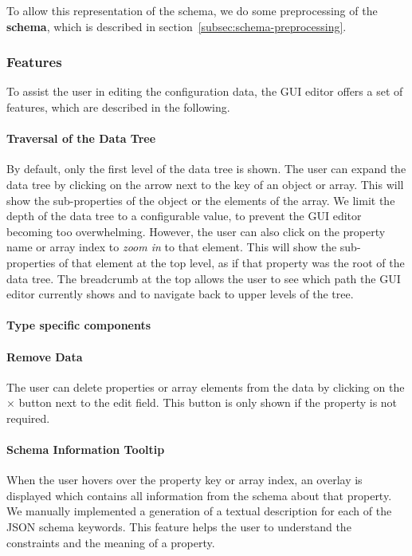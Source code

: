 To allow this representation of the schema, we do some preprocessing of the \textbf{schema}, which is described in section~\ref{subsec:schema-preprocessing}.

\subsubsection{Features}\label{subsubsec:gui-editor-features}

To assist the user in editing the configuration data, the GUI editor offers a set of features, which are described in the following.

\paragraph{Traversal of the Data Tree}
By default, only the first level of the data tree is shown.
The user can expand the data tree by clicking on the arrow next to the key of an object or array.
This will show the sub-properties of the object or the elements of the array.
We limit the depth of the data tree to a configurable value, to prevent the GUI editor becoming too overwhelming.
However, the user can also click on the property name or array index to \textit{zoom in} to that element.
This will show the sub-properties of that element at the top level, as if that property was the root of the data tree.
The breadcrumb at the top allows the user to see which path the GUI editor currently shows and to navigate back to upper levels of the tree.


\paragraph{Type specific components}


\paragraph{Remove Data}
The user can delete properties or array elements from the data by clicking on the $\times$ button next to the edit field.
This button is only shown if the property is not required.

\paragraph{Schema Information Tooltip}
When the user hovers over the property key or array index, an overlay is displayed which contains all information from the schema about that property.
We manually implemented a generation of a textual description for each of the JSON schema keywords.
This feature helps the user to understand the constraints and the meaning of a property.

